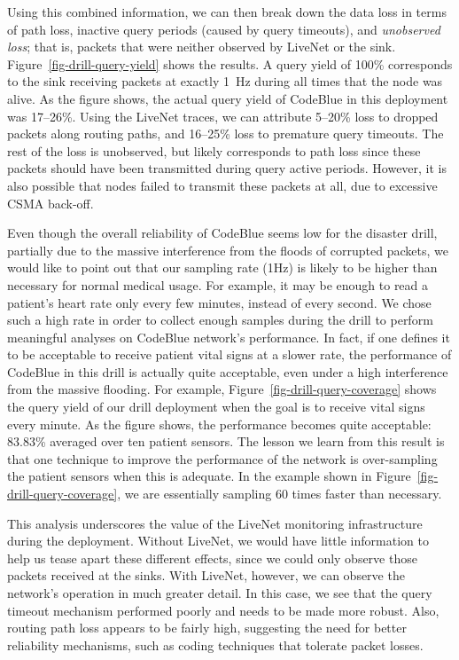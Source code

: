 Using this combined information, we can then break down the data loss 
in terms of path loss, inactive query periods (caused by query timeouts), and 
{\em unobserved loss}; that is, packets that were neither observed by
LiveNet or the sink. Figure~\ref{fig-drill-query-yield} shows the results. 
A query yield of 100\% corresponds to the sink receiving packets at
exactly 1~Hz during all times that the node was alive. As the figure
shows, the actual query yield of CodeBlue in this deployment was 17--26\%. Using the
LiveNet traces, we can attribute 5--20\% loss to dropped packets
along routing paths, and 16--25\% loss to premature query timeouts. 
The rest of the loss is unobserved, but likely corresponds to path
loss since these packets should have been transmitted during query
active periods. However, it is also possible that nodes failed to
transmit these packets at all, due to excessive CSMA back-off. 

Even though the overall reliability of CodeBlue seems low for the disaster
drill, partially due to the massive interference from the floods of corrupted
packets, we would like to point out that our sampling rate (1Hz) is likely to
be higher than necessary for normal medical usage.  For example, it may be
enough to read a patient's heart rate only every few minutes, instead of every
second. We chose such a high rate in order to collect enough samples during
the drill to perform meaningful analyses on CodeBlue network's performance. In
fact, if one defines it to be acceptable to receive patient vital signs at a
slower rate, the performance of CodeBlue in this drill is actually quite
acceptable, even under a high interference from the massive flooding. For
example, Figure~\ref{fig-drill-query-coverage} shows the query yield of our
drill deployment when the goal is to receive vital signs every minute. As the
figure shows, the performance becomes quite acceptable: 83.83\% averaged over
ten patient sensors. The lesson we learn from this result is that one
technique to improve the performance of the network is over-sampling the
patient sensors when this is adequate. In the example shown in
Figure~\ref{fig-drill-query-coverage}, we are essentially sampling 60 times
faster than necessary.

This analysis underscores the value of the LiveNet monitoring
infrastructure during the deployment. Without LiveNet, we would have
little information to help us tease apart these different effects, since
we could only observe those packets received at the sinks. With
LiveNet, however, we can observe the network's operation in much greater
detail. In this case, we see that the query timeout mechanism performed
poorly and needs to be made more robust. Also, routing path loss
appears to be fairly high, suggesting the need for better reliability
mechanisms, such as coding techniques that tolerate packet losses.



